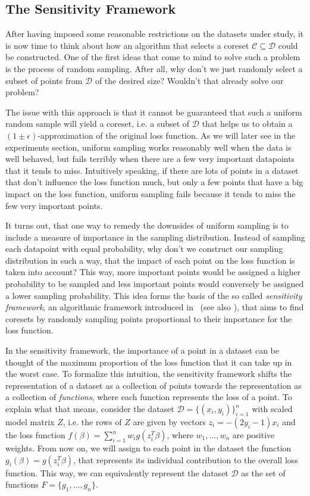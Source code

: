 \subsection{The Sensitivity Framework}

After having imposed some reasonable restrictions on the
datasets under study, it is now time to think about
how an algorithm that selects a coreset
$\mathcal{C} \subseteq \mathcal{D}$ could be constructed.
One of the first ideas that come to mind to solve such a problem
is the process of random sampling.
After all, why don't we just randomly select a subset of
points from $\mathcal{D}$ of the desired size?
Wouldn't that already solve our problem?

The issue with this approach is that it cannot be guaranteed
that such a uniform random sample will yield a coreset,
i.e. a subset of $\mathcal{D}$ that helps us to obtain a
$(1 \pm \epsilon)$-approximation of the original loss function.
As we will later see in the experiments section, uniform sampling
works reasonably well when the data is well behaved, but fails
terribly when there are a few very important datapoints that
it tends to miss.
Intuitively speaking,
if there are lots of points in a dataset that don't influence the
loss function much, but only a few points that have a big impact
on the loss function, uniform sampling fails because it tends
to miss the few very important points.

It turns out, that one way to remedy the downsides of uniform sampling
is to include a measure of importance in the sampling distribution.
Instead of sampling each datapoint with equal probability,
why don't we construct our sampling distribution in such a way,
that the impact of each point on the loss function is taken into
account? This way, more important points would be assigned
a higher probability to be sampled and less important points
would conversely be assigned a lower sampling probability.
This idea forms the basis of the so called
\textit{sensitivity framework}, an algorithmic framework
introduced in~\cite{feldman-langberg-coresets}
(see also \cite{big-data-tiny-data}), that aims to
find coresets by randomly sampling points proportional to
their importance for the loss function.

In the sensitivity framework, the importance of a point
in a dataset can be thought of the maximum proportion of
the loss function that it can take up in the worst case.
To formalize this intuition, the sensitivity framework shifts
the representation of a dataset as a collection of
points towards the representation as a collection of
\textit{functions}, where each function represents the
loss of a point.
To explain what that means, consider the dataset
$\mathcal{D} = \{(x_i, y_i)\}_{i=1}^n$ with scaled model
matrix $Z$, i.e. the rows of $Z$ are given by vectors
$z_i = -(2y_i-1)x_i$ and the loss function
$f(\beta) = \sum_{i=1}^n w_ig(z_i^T\beta)$, where
$w_1, ..., w_n$ are positive weights.
From now on, we will assign to each point in the dataset the
function $g_i(\beta) = g(z_i^T\beta)$, that represents its
individual contribution to the overall loss function.
This way, we can equivalently represent the dataset $\mathcal{D}$
as the set of functions $F = \{g_1, ..., g_n\}$.

